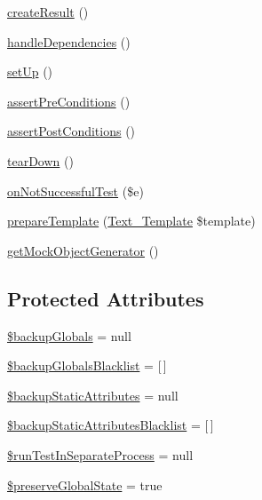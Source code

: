 \begin{DoxyCompactItemize}
\item 
\mbox{\hyperlink{class_p_h_p_unit___framework___test_case_a3f3ab385dd8747091f1bdfbb11ed6eca}{create\+Result}} ()
\item 
\mbox{\hyperlink{class_p_h_p_unit___framework___test_case_afed925b2a2585b9ea5101ef7e56e4ec0}{handle\+Dependencies}} ()
\item 
\mbox{\hyperlink{class_p_h_p_unit___framework___test_case_a0bc688732d2b3b162ffebaf7812e78da}{set\+Up}} ()
\item 
\mbox{\hyperlink{class_p_h_p_unit___framework___test_case_ad6402f56c691a56954229b7e6a2294aa}{assert\+Pre\+Conditions}} ()
\item 
\mbox{\hyperlink{class_p_h_p_unit___framework___test_case_abf54422376f10d9cbe49a06676e39e86}{assert\+Post\+Conditions}} ()
\item 
\mbox{\hyperlink{class_p_h_p_unit___framework___test_case_a80fe3d17e658907fc75346a0ec9d6fc7}{tear\+Down}} ()
\item 
\mbox{\hyperlink{class_p_h_p_unit___framework___test_case_a473697cfd0fdd4b144cd25c26a7bc29a}{on\+Not\+Successful\+Test}} (\$e)
\item 
\mbox{\hyperlink{class_p_h_p_unit___framework___test_case_a0239ab002c9e97ae4d611351e7113383}{prepare\+Template}} (\mbox{\hyperlink{class_text___template}{Text\+\_\+\+Template}} \$template)
\item 
\mbox{\hyperlink{class_p_h_p_unit___framework___test_case_a0463edc4099023a15de10a77750cc19f}{get\+Mock\+Object\+Generator}} ()
\end{DoxyCompactItemize}
\subsection*{Protected Attributes}
\begin{DoxyCompactItemize}
\item 
\mbox{\hyperlink{class_p_h_p_unit___framework___test_case_a7c6af4e36636a61ec139a77a1c07cffe}{\$backup\+Globals}} = null
\item 
\mbox{\hyperlink{class_p_h_p_unit___framework___test_case_aaf9b051088f79bef96185bef196e9329}{\$backup\+Globals\+Blacklist}} = \mbox{[}$\,$\mbox{]}
\item 
\mbox{\hyperlink{class_p_h_p_unit___framework___test_case_a563497416305ba3d1caeb0dbe4454bb3}{\$backup\+Static\+Attributes}} = null
\item 
\mbox{\hyperlink{class_p_h_p_unit___framework___test_case_ac34484101a5ba63b718144826ff3ae77}{\$backup\+Static\+Attributes\+Blacklist}} = \mbox{[}$\,$\mbox{]}
\item 
\mbox{\hyperlink{class_p_h_p_unit___framework___test_case_a7e113cd6fbfe94d18fe43cf7bbd0f899}{\$run\+Test\+In\+Separate\+Process}} = null
\item 
\mbox{\hyperlink{class_p_h_p_unit___framework___test_case_a899cb0f144f3e99e6aa5bf17915a7f57}{\$preserve\+Global\+State}} = true
\end{DoxyCompactItemize}


